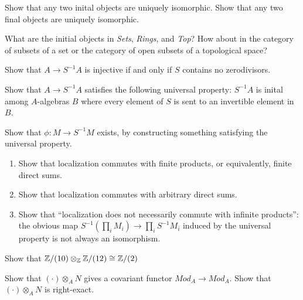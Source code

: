 
\begin{exercise}
    Show that any two inital objects are uniquely isomorphic. Show that any two final objects are uniquely isomorphic.
\end{exercise}

\begin{exercise}
    What are the initial objects in \textit{Sets}, \textit{Rings}, and \textit{Top}? How about in the category of subsets of a set or the category of open subsets of a topological space? 
\end{exercise}

\begin{exercise}
    Show that $A \to S^{-1}A$ is injective if and only if $S$ contains no zerodivisors. 
\end{exercise}

\begin{exercise}
    Show that $A \to S^{-1}A$ satisfies the following universal property: $S^{-1}A$ is inital among $A$-algebras $B$ where every element of $S$ is sent to an invertible element in $B$.
\end{exercise}
    
\begin{exercise}
    Show that $\phi: M \to S^{-1}M$ exists, by constructing something satisfying the universal property. 
\end{exercise}

\begin{exercise} \mbox{}
    \begin{enumerate}[label = (\alph*)]
        \item Show that localization commutes with finite products, or equivalently, finite direct sums. 
        \item Show that localization commutes with arbitrary direct sums. 
        \item Show that ``localization does not necessarily commute with infinite products'': the obvious map $S^{-1}(\prod_i M_i) \to \prod_i S^{-1} M_i$ induced by the universal property is not always an isomorphism. 
    \end{enumerate}
\end{exercise}

\begin{exercise}
    Show that $\mathbb{Z}/(10) \otimes_{\mathbb{Z}} \mathbb{Z}/(12) \cong \mathbb{Z}/(2)$ 
\end{exercise}

\begin{exercise}
    Show that $(\cdot) \otimes_A N$ gives a covariant functor $Mod_A \to Mod_A$. Show that $(\cdot) \otimes_A N$ is right-exact. 
\end{exercise}

